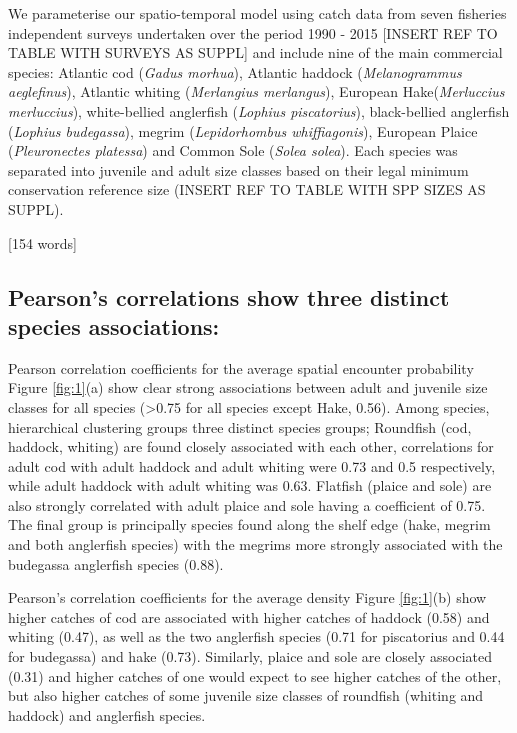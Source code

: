 \documentclass{nature}
\begin{document}
\begin{linenumbers}
We parameterise our spatio-temporal model using catch data from seven fisheries
independent surveys undertaken over the period 1990 - 2015 [INSERT REF TO TABLE
WITH SURVEYS AS SUPPL] and include nine of the main commercial species:
Atlantic cod (\textit{Gadus morhua}), Atlantic haddock (\textit{Melanogrammus
	aeglefinus}), Atlantic whiting (\textit{Merlangius merlangus}),
European Hake(\textit{Merluccius merluccius}), white-bellied anglerfish
(\textit{Lophius piscatorius}), black-bellied anglerfish (\textit{Lophius
	budegassa}), megrim (\textit{Lepidorhombus whiffiagonis}), European
Plaice (\textit{Pleuronectes platessa}) and Common Sole (\textit{Solea solea}).
Each species was separated into juvenile and adult size classes based on their
legal minimum conservation reference size (INSERT REF TO TABLE WITH SPP SIZES
AS SUPPL). 

[154 words]

\subsection{Pearson's correlations show three distinct species associations:}
Pearson correlation coefficients for the average spatial encounter probability
Figure \ref{fig:1}(a) show clear strong associations between adult and juvenile
size classes for all species (\textgreater 0.75 for all species except Hake,
0.56).  Among species, hierarchical clustering groups three distinct species
groups; Roundfish (cod, haddock, whiting) are found closely associated with
each other, correlations for adult cod with adult haddock and adult whiting
were 0.73 and 0.5 respectively, while adult haddock with adult whiting was
0.63. Flatfish (plaice and sole) are also strongly correlated with adult plaice
and sole having a coefficient of 0.75. The final group is principally species
found along the shelf edge (hake, megrim and both anglerfish species) with the
megrims more strongly associated with the budegassa anglerfish species (0.88).

Pearson's correlation coefficients for the average density Figure
\ref{fig:1}(b) show higher catches of cod are associated with higher catches of
haddock (0.58) and whiting (0.47), as well as the two anglerfish species (0.71
for piscatorius and 0.44 for budegassa) and hake (0.73). Similarly, plaice and
sole are closely associated (0.31) and higher catches of one would expect to
see higher catches of the other, but also higher catches of some juvenile size
classes of roundfish (whiting and haddock) and anglerfish species.


\end{linenumbers}
\end{document}
